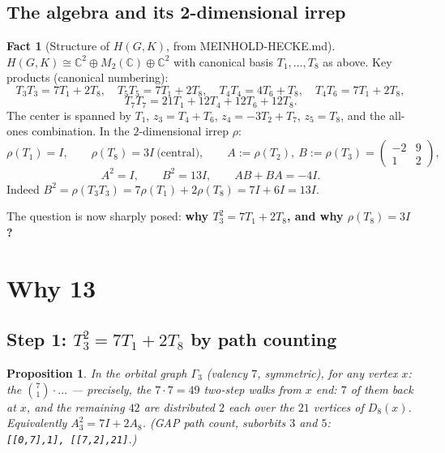 \documentclass[11pt]{article}
\newtheorem{proposition}[theorem]{Proposition}
\theoremstyle{definition}
\newtheorem{fact}[theorem]{Fact}
\newcommand{\C}{\mathbb{C}}
\begin{document}
\subsection{The algebra and its 2-dimensional irrep}

\begin{fact}[Structure of $H(G,K)$, from MEINHOLD-HECKE.md]\label{fact:algebra}
$H(G,K) \cong \C^2 \oplus M_2(\C) \oplus \C^2$ with canonical basis
$T_1,\dots,T_8$ as above. Key products (canonical numbering):
\[
T_3 T_3 = 7T_1 + 2T_8,\quad
T_5 T_5 = 7T_1 + 2T_8,\quad
T_4 T_4 = 4T_6 + T_8,\quad
T_4 T_6 = 7T_1 + 2T_8,
\]
\[
T_7T_7 = 21T_1 + 12T_4 + 12T_6 + 12T_8 .
\]
The center is spanned by $T_1$, $z_3 = T_4{+}T_6$, $z_4 = -3T_2{+}T_7$,
$z_5 = T_8$, and the all-ones combination. In the $2$-dimensional irrep
$\rho$:
\[
\rho(T_1) = I,\qquad \rho(T_8) = 3I \ \text{(central)},\qquad
A := \rho(T_2),\ B := \rho(T_3) = \begin{pmatrix}-2&9\\1&2\end{pmatrix},
\]
\[
A^2 = I,\qquad B^2 = 13I,\qquad AB + BA = -4I.
\]
Indeed $B^2 = \rho(T_3T_3) = 7\rho(T_1) + 2\rho(T_8) = 7I + 6I = 13I$.
\end{fact}

The question is now sharply posed: \textbf{why $T_3^2 = 7T_1 + 2T_8$, and
why $\rho(T_8) = 3I$?}

\section{Why 13}\label{sec:why13}

\subsection{Step 1: $T_3^2 = 7T_1 + 2T_8$ by path counting}

\begin{proposition}\label{prop:pathcount}
In the orbital graph $\Gamma_3$ (valency $7$, symmetric), for any vertex
$x$: the $\binom{7}{1}\cdot \ldots$ --- precisely, the $7\cdot 7 = 49$
two-step walks from $x$ end: $7$ of them back at $x$, and the remaining
$42$ are distributed $2$ each over the $21$ vertices of $D_8(x)$.
Equivalently $A_3^2 = 7I + 2A_8$. (GAP path count, suborbits $3$ and $5$:
\texttt{[[0,7],1],\ [[7,2],21]}.)
\end{proposition}
\end{document}
